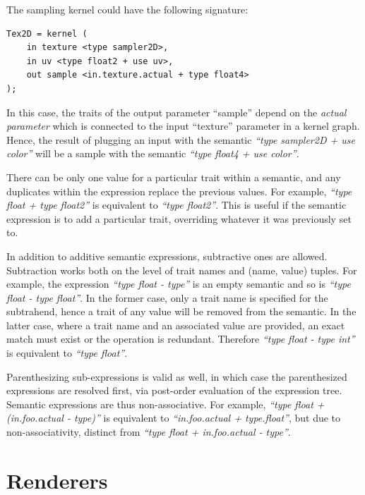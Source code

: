 The sampling kernel could have the following signature:

\noindent\begin{minipage}{\textwidth}
\begin{lstlisting}[frame=single]
Tex2D = kernel (
    in texture <type sampler2D>,
    in uv <type float2 + use uv>,
    out sample <in.texture.actual + type float4>
);
\end{lstlisting}
\end{minipage}


In this case, the traits of the output parameter ``sample'' depend on the \emph{actual parameter} which is connected to the input ``texture'' parameter in a kernel graph. Hence, the result of plugging an input with the semantic \emph{``type sampler2D + use color''} will be a sample with the semantic \emph{``type float4 + use color''}.

There can be only one value for a particular trait within a semantic, and any duplicates within the expression replace the previous values. For example, \emph{``type float + type float2''} is equivalent to \emph{``type float2''}. This is useful if the semantic expression is to add a particular trait, overriding whatever it was previously set to.

In addition to additive semantic expressions, subtractive ones are allowed. Subtraction works both on the level of trait names and (name, value) tuples. For example, the expression \emph{``type float - type''} is an empty semantic and so is \emph{``type float - type float''}. In the former case, only a trait name is specified for the subtrahend, hence a trait of any value will be removed from the semantic. In the latter case, where a trait name and an associated value are provided, an exact match must exist or the operation is redundant. Therefore \emph{``type float - type int''} is equivalent to \emph{``type float''}.

Parenthesizing sub-expressions is valid as well, in which case the parenthesized expressions are resolved first, via post-order evaluation of the expression tree. Semantic expressions are thus non-associative. For example, \emph{``type float + (in.foo.actual - type)''} is equivalent to \emph{``in.foo.actual + type.float''}, but due to non-associativity, distinct from \emph{``type float + in.foo.actual - type''}.

\section{Renderers}
\label{sec:Renderers}

